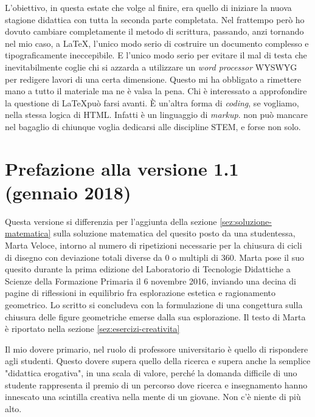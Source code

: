 L'obiettivo, in questa estate che volge al finire, era quello di iniziare la nuova stagione didattica con tutta la seconda parte completata. Nel frattempo però ho dovuto cambiare completamente il metodo di scrittura, passando, anzi tornando nel mio caso, a \LaTeX, l'unico modo serio di costruire un documento complesso e tipograficamente ineccepibile. E l'unico modo serio per evitare il mal di testa che inevitabilmente coglie chi si azzarda a utilizzare un \textit{word processor} WYSWYG per redigere lavori di una certa dimensione. Questo mi ha obbligato a rimettere mano a tutto il materiale ma ne è valsa la pena. Chi è interessato a approfondire la questione di \LaTeX  può farsi avanti. È un'altra forma di \textit{coding}, se vogliamo, nella stessa logica di HTML. Infatti è un linguaggio di \textit{markup}. non può mancare nel bagaglio di chiunque voglia dedicarsi alle discipline STEM, e forse non solo. 

\section{Prefazione alla versione 1.1 (gennaio 2018)}

Questa versione si differenzia per l'aggiunta della sezione \ref{sez:soluzione-matematica} sulla soluzione matematica del quesito posto da una studentessa, Marta Veloce, intorno al numero di ripetizioni necessarie per la chiusura di cicli di disegno con deviazione totali diverse da 0 o multipli di 360\degree. Marta pose il suo quesito durante la prima edizione del Laboratorio di Tecnologie Didattiche a Scienze della Formazione Primaria il 6 novembre 2016, inviando una decina di pagine di riflessioni in equilibrio fra esplorazione estetica e ragionamento geometrico. Lo scritto si concludeva con la formulazione di una congettura sulla chiusura delle figure geometriche emerse dalla sua esplorazione. Il testo di Marta è riportato nella sezione \ref{sez:esercizi-creativita}

Il mio dovere primario, nel ruolo di professore universitario è quello di rispondere agli studenti. Questo dovere supera quello della ricerca e supera anche la semplice "didattica erogativa", in una scala di valore, perché la domanda difficile di uno studente rappresenta il premio di un percorso dove ricerca e insegnamento hanno innescato una scintilla creativa nella mente di un giovane. Non c'è niente di più alto.

